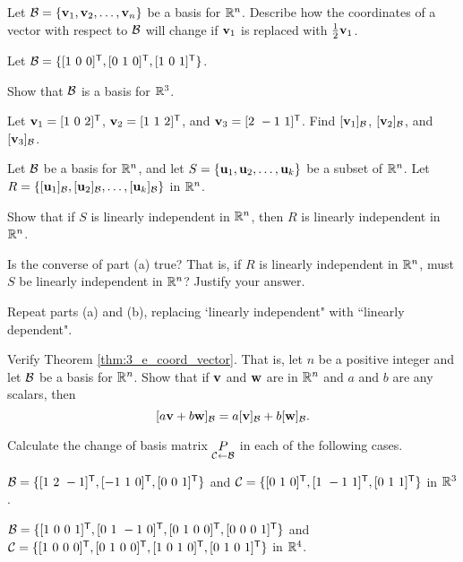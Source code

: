 \item Let $\mathcal{B}=\{ \mathbf{v}_1, \mathbf{v}_2, \ldots, \mathbf{v}_n\}$ be a basis for $\mathbb{R}^n$. Describe how the coordinates of a vector with respect to $\mathcal{B}$ will change if $\mathbf{v}_1$ is replaced with $\frac{1}{2}\mathbf{v}_1$.

\item Let $\CB = \{[1 \ 0 \ 0]^{\tr}, [0 \ 1 \ 0]^{\tr}, [1 \ 0 \ 1]^{\tr}\}$.
	\ba
	\item Show that $\mathcal{B}$ is a basis for $\mathbb{R}^3$.
	\item Let $\mathbf{v}_1 = [1 \ 0 \ 2]^{\mathsf{T}}$, $\mathbf{v}_2=[1 \ 1 \ 2]^{\mathsf{T}}$, and $\mathbf{v}_3 = [2 \ -1 \ 1]^{\mathsf{T}}$.
Find $[\mathbf{v}_1]_{\mathcal{B}}$, $[\mathbf{v}_2]_{\mathcal{B}}$, and $[\mathbf{v}_3]_{\mathcal{B}}$. 
	\ea


\item Let $\mathcal{B}$ be a basis for $\mathbb{R}^n$, and let $S = \{\mathbf{u}_1, \mathbf{u}_2, \ldots, \mathbf{u}_k\}$ be a subset of $\mathbb{R}^n$.  Let $R = \{[\mathbf{u}_1]_{\mathcal{B}}, [\mathbf{u}_2]_{\mathcal{B}}, \ldots, [\mathbf{u}_k]_{\mathcal{B}}\}$ in $\mathbb{R}^n$. 
	\ba
	\item Show that if $S$ is linearly independent in $\mathbb{R}^n$, then $R$ is linearly independent in $\mathbb{R}^n$. 
	\item Is the converse of part (a) true? That is, if $R$ is linearly independent in $\mathbb{R}^n$, must $S$ be linearly independent in $\mathbb{R}^n$? Justify your answer. 
	\item Repeat parts (a) and (b), replacing `linearly independent" with ``linearly dependent". 
	\ea

\item Verify Theorem \ref{thm:3_e_coord_vector}. That is, let $n$ be a positive integer and let $\mathcal{B}$ be a basis for $\mathbb{R}^n$. Show that if $\mathbf{v}$ and $\mathbf{w}$ are in $\mathbb{R}^n$ and $a$ and $b$ are any scalars, then 
\[[a\mathbf{v}+b\mathbf{w}]_{\mathcal{B}} = a[\mathbf{v}]_{\mathcal{B}} + b[\mathbf{w}]_{\mathcal{B}}.\]

\item Calculate the change of basis matrix $\underset{\mathcal{C} \leftarrow \mathcal{B}}{P}$ in each of the following cases.
	\ba
	\item $\CB = \{[1 \ 2 \ -1]^{\tr}, [-1 \ 1 \ 0]^{\tr}, [0 \ 0 \ 1]^{\tr}\}$ and $\mathcal{C} = \{[0 \ 1 \ 0]^{\mathsf{T}}, [1 \ -1 \ 1]^{\mathsf{T}}, [0 \ 1 \ 1]^{\mathsf{T}}\}$ in $\mathbb{R}^3$. 
	\item $\mathcal{B} = \{[1 \ 0 \ 0 \ 1]^{\mathsf{T}}, [0 \ 1 \ -1 \ 0]^{\mathsf{T}}, [0 \ 1 \ 0 \ 0]^{\mathsf{T}}, [0 \ 0 \ 0 \ 1]^{\mathsf{T}}\}$ and \\
	$\CC = \{[1 \ 0 \ 0 \ 0]^{\tr}, [0 \ 1 \ 0 \ 0]^{\tr}, [1 \ 0 \ 1 \ 0]^{\tr}, [0 \ 1 \ 0 \ 1]^{\tr}\}$ in $\mathbb{R}^4$. 
	\ea

